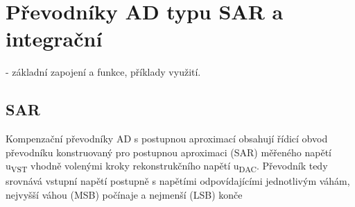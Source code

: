 \section{Převodníky AD typu SAR a integrační}
- základní zapojení a funkce, příklady využití.

\subsection{SAR}
Kompenzační převodníky AD s postupnou aproximací obsahují řídicí obvod převodníku konstruovaný pro postupnou aproximaci (SAR) měřeného napětí u\textsubscript{VST} vhodně volenými kroky rekonstrukčního napětí u\textsubscript{DAC}. Převodník tedy srovnává vstupní napětí postupně s napětími odpovídajícími jednotlivým váhám, nejvyšší váhou (MSB) počínaje a nejmenší (LSB) konče